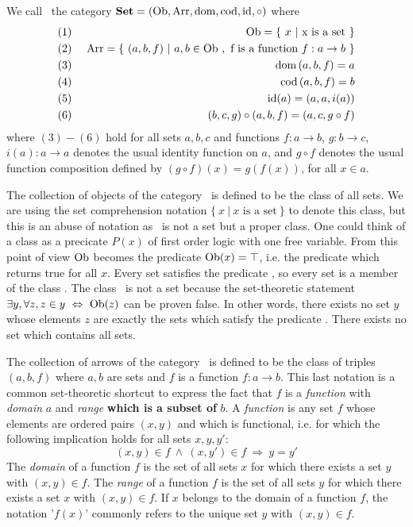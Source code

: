 \begin{defin}\label{Cat:def:set}
    We call \Set\ the category $\mbox{\bf Set}=(\mbox{\rm Ob}, \mbox{\rm Arr}, \mbox{\rm dom}, \mbox{\rm cod}, \mbox{\rm id}, \circ)$ where
    \begin{eqnarray*}
        (1)&\ &\ob = \{\ x\ |\  \mbox{x is a set}\ \}\\
        (2)&\ &\arr = \{\ (a,b,f)\ |\  a,b\in\ob\ ,\ 
        \mbox{f is a function $f : a\to b$}\ \}\\
        (3)&\ &\dom\,(a,b,f) = a\\
        (4)&\ &\cod\,(a,b,f) = b\\
        (5)&\ &\id(a) = (a,a,i(a))\\
        (6)&\ &(b,c,g)\circ(a,b,f) = (a,c,g\circ f)
    \end{eqnarray*}
    where $(3)-(6)$ hold for all sets $a,b,c$ and functions $f:a\to b$,
    $g:b\to c$, $i(a):a\to a$ denotes the usual identity function on $a$,
    and $g\circ f$ denotes the usual function composition defined by 
    $(g\circ f)(x)=g(f(x))$, for all $x\in a$.
\end{defin}
The collection of objects of the category \Set\ is defined to be the 
class of all sets. We are using the set comprehension notation 
$\{\ x\ |\ \mbox{$x$ is a set}\ \}$ to denote this class, but this is an
abuse of notation as \ob\ is not a set but a proper class. One could 
think of a class as a precicate $P(x)$ of first order logic with one
free variable. From this point of view $\mbox{\rm Ob}$ becomes the predicate
$\mbox{\rm Ob}(x)=\top$, i.e. the predicate which returns true for all $x$.
Every set satisfies the predicate \ob, so every set is a member of 
the class \ob. The class \ob\ is not a set because the set-theoretic
statement $\exists y, \forall z, z\in y\ \Leftrightarrow\ \ob(z)$
can be proven false. In other words, there exists no set $y$ whose
elements $z$ are exactly the sets which satisfy the predicate \ob.
There exists no set which contains all sets.

The collection of arrows of the category \Set\ is defined to be the 
class of triples $(a,b,f)$ where $a,b$ are sets and $f$ is a function
$f:a\to b$. This last notation is a common set-theoretic shortcut to
express the fact that $f$ is a {\em function} with {\em domain} $a$ and 
{\em range} {\bf which is a subset of} $b$. A {\em function} is any set $f$
whose elements are ordered pairs $(x,y)$ and which is functional, i.e.
for which the following implication holds for all sets $x,y,y'$:
    \[
        (x,y)\in f\ \land\ (x,y')\in f\ \Rightarrow\ y = y'
    \]
The {\em domain} of a function $f$ is the set of all sets $x$ for which there
exists a set $y$ with $(x,y)\in f$. The {\em range} of a function $f$ is the 
set of all sets $y$ for which there exists a set $x$ with $(x,y)\in f$.
If $x$ belongs to the domain of a function $f$, the notation '$f(x)$' commonly
refers to the unique set $y$ with $(x,y)\in f$. 


